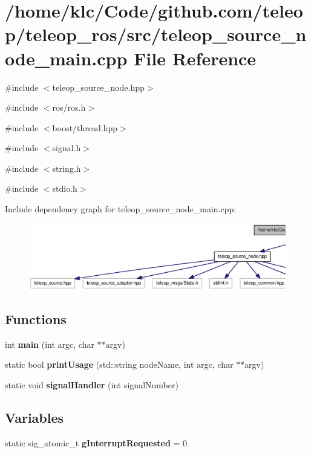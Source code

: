 \section{/home/klc/Code/github.com/teleop/teleop\_\-ros/src/teleop\_\-source\_\-node\_\-main.cpp File Reference}
\label{teleop__source__node__main_8cpp}
{\ttfamily \#include $<$teleop\_\-source\_\-node.hpp$>$}\par
{\ttfamily \#include $<$ros/ros.h$>$}\par
{\ttfamily \#include $<$boost/thread.hpp$>$}\par
{\ttfamily \#include $<$signal.h$>$}\par
{\ttfamily \#include $<$string.h$>$}\par
{\ttfamily \#include $<$stdio.h$>$}\par
Include dependency graph for teleop\_\-source\_\-node\_\-main.cpp:
\nopagebreak
\begin{figure}[H]
\begin{center}
\leavevmode
\includegraphics[width=400pt]{teleop__source__node__main_8cpp__incl}
\end{center}
\end{figure}
\subsection*{Functions}
\begin{DoxyCompactItemize}
\item 
int {\bf main} (int argc, char $\ast$$\ast$argv)
\item 
static bool {\bf printUsage} (std::string nodeName, int argc, char $\ast$$\ast$argv)
\item 
static void {\bf signalHandler} (int signalNumber)
\end{DoxyCompactItemize}
\subsection*{Variables}
\begin{DoxyCompactItemize}
\item 
static sig\_\-atomic\_\-t {\bf gInterruptRequested} = 0
\end{DoxyCompactItemize}


